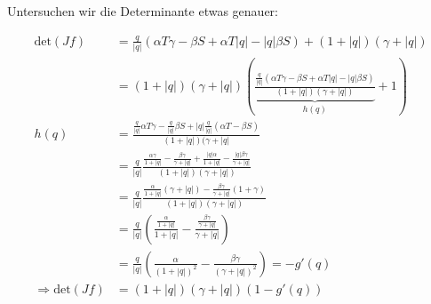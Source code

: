 \documentclass[a4paper,twoside]{article}
\begin{document}
	Untersuchen wir die Determinante etwas genauer:
	\begin{footnotesize}
	\begin{align*}
		\textrm{det}(Jf) &= \frac{q}{|q|}\left(\alpha T \gamma - \beta S + \alpha T |q| - |q|\beta S\right) + (1 + |q|)(\gamma + |q|) \\
		&= (1 + |q|)(\gamma + |q|) \left(
		\underbrace{
		\frac{\frac{q}{|q|}\left(\alpha T \gamma - \beta S + \alpha T |q| - |q|\beta S\right)}{(1 + |q|)(\gamma + |q|)}}_{h(q)} + 1
		\right)\\
		h(q) &= \frac{\frac{q}{|q|}\alpha T \gamma - \frac{q}{|q|}\beta S + |q|\frac{q}{|q|}(\alpha T - \beta S)}
		{(1+|q|)(\gamma + |q|} \\
		&= 
		\frac{q}{|q|}
		\frac{\frac{\alpha \gamma}{1 + |q|} - \frac{\beta \gamma}{\gamma + |q|} + 
		\frac{|q| \alpha}{1+|q|} - \frac{|q| \beta\gamma}{\gamma + |q|}}
		{(1+|q|)(\gamma + |q|)} \\
		&= \frac{q}{|q|}
		\frac{\frac{\alpha}{1+|q|}(\gamma + |q|) - \frac{\beta \gamma}{\gamma + |q|}(1 + \gamma)}
		{(1+|q|)(\gamma + |q|)} \\
		&= \frac{q}{|q|} \left(
			\frac{\frac{\alpha}{1+|q|}}{1+|q|} - \frac{\frac{\beta \gamma}{\gamma + |q|}}{\gamma+|q|}
		\right) \\
		&= \frac{q}{|q|}
		\left(
			\frac{\alpha}{(1 + |q|)^2} - \frac{\beta \gamma}{(\gamma + |q|)^2}
		\right)
		= -g'(q) \\
		\Rightarrow \textrm{det}(Jf) &= (1 + |q|)(\gamma + |q|)(1 - g'(q))
	\end{align*}
	\end{footnotesize}		
	
\end{document}
